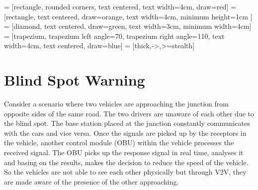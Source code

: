 \documentclass[12pt]{report}
\begin{document}
	
 = [rectangle, rounded corners, text centered, text width=4cm, draw=red]
 = [rectangle, text centered, draw=orange,  text width=4cm, minimum height=1cm ]
 = [diamond, text centered, draw=green, text width=3cm, minimum width=4cm]
 = [trapezium, trapezium left angle=70, trapezium right angle=110, text width=4cm, text centered, draw=blue]
 = [thick,->,>=stealth]






\section{Blind Spot Warning}

Consider a scenario where two vehicles are approaching the junction from opposite sides of the same road. The two drivers are unaware of each other due to the blind spot. The base station placed at the junction constantly communicates with the cars and vice versa.
Once the signals are picked up by the receptors in the vehicle, another control module (OBU) within the vehicle processes the received signal. The OBU picks up the response signal in real time, analyses it and basing on the results, makes the decision to reduce the speed of the vehicle.
So the vehicles are not able to see each other physically but through V2V, they are made aware of the presence of the other approaching.
\end{document}
